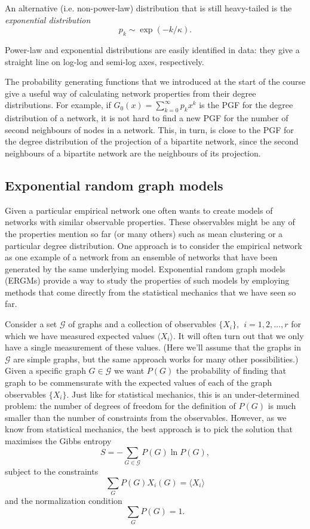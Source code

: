 \documentclass{article}
\begin{document}
An alternative (i.e. non-power-law) distribution that is still heavy-tailed is the \emph{exponential distribution}
$$
	p_k\sim\exp(-k/\kappa).
$$

Power-law and exponential distributions are easily identified in data: they give a straight line on log-log and semi-log axes, respectively.

The probability generating functions that we introduced at the start of the course give a useful way of calculating network properties from their degree distributions. For example, if $G_0(x) = \sum_{k=0}^\infty p_kx^k$ is the PGF for the degree distribution of a network, it is not hard to find a new PGF for the number of second neighbours of nodes in a network. This, in turn, is close to the PGF for the degree distribution of the projection of a bipartite network, since the second neighbours of a bipartite network are the neighbours of its projection.


\subsection*{Exponential random graph models}
Given a particular empirical network one often wants to create models of networks with similar observable properties. These observables might be any of the properties mention so far (or many others) such as mean clustering or a particular degree distribution. One approach is to consider the empirical network as one example of a network from an ensemble of networks that have been generated by the same underlying model. Exponential random graph models (ERGMs) provide a way to study the properties of such models by employing methods that come directly from the statistical mechanics that we have seen so far.

Consider a set $\mathcal{G}$ of graphs and a collection of observables $\{X_i\},~~i=1,2,\ldots,r$ for which we have measured expected values $\langle X_i\rangle$. It will often turn out that we only have a single measurement of these values. (Here we'll assume that the graphs in $\mathcal{G}$ are simple graphs, but the same approach works for many other possibilities.) Given a specific graph $G\in\mathcal{G}$ we want $P(G)$ the probability of finding that graph to be commensurate with the expected values of each of the graph observables $\{X_i\}$. Just like for statistical  mechanics, this is an under-determined problem: the number of degrees of freedom for the definition of $P(G)$ is much smaller than the number of constraints from the observables. However, as we know from statistical mechanics, the best approach is to pick the solution that maximises the Gibbs entropy
$$
	S= -\sum_{G\in\mathcal{G}}P(G)\ln P(G),
$$
subject to the constraints
$$
	\sum_G P(G)X_i(G) = \langle X_i\rangle
$$
and the normalization condition
$$
	\sum_G P(G) =1.
$$
\end{document}
